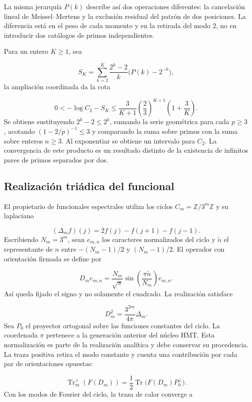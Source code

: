 La misma jerarquía $P(k)$ describe así dos operaciones diferentes: la cancelación lineal de Meissel–Mertens y la exclusión residual del patrón de dos posiciones. La diferencia está en el peso de cada momento y en la retirada del modo $2$, no en introducir dos catálogos de primos independientes.

Para un entero \(K\ge1\), sea

\[
S_K=\sum_{k=2}^K\frac{2^k-2}{k}\bigl(P(k)-2^{-k}\bigr),
\]
la ampliación coordinada da la cota

\[
0<-\log C_2-S_K
\le\frac3{K+1}\left(\frac23\right)^{K+1}\left(1+\frac3K\right).
\]
Se obtiene sustituyendo $2^k-2\le2^k$, sumando la serie geométrica para cada $p\ge3$, acotando $(1-2/p)^{-1}\le3$ y comparando la suma sobre primos con la suma sobre enteros $n\ge3$. Al exponentiar se obtiene un intervalo para $C_2$. La convergencia de este producto es un resultado distinto de la existencia de infinitos pares de primos separados por dos.



\subsection{Realización triádica del funcional}
El propietario de funcionales espectrales utiliza los ciclos $C_m=\mathbb Z/3^m\mathbb Z$ y su laplaciano

\[
(\Delta_mf)(j)=2f(j)-f(j+1)-f(j-1).
\]
Escribiendo \(N_m=3^m\), sean \(e_{m,n}\) los caracteres normalizados del ciclo y \(\widetilde n\) el representante de \(n\) entre \(-(N_m-1)/2\) y \((N_m-1)/2\). El operador con orientación firmada se define por

\[
D_m e_{m,n}=\frac{N_m}{\sqrt{\pi}}
\sin\left(\frac{\pi\widetilde n}{N_m}\right)e_{m,n}.
\]
Así queda fijado el signo y no solamente el cuadrado. La realización satisface

\[
D_m^2=\frac{3^{2m}}{4\pi}\Delta_m.
\]
Sea \(P_0\) el proyector ortogonal sobre las funciones constantes del ciclo. La coordenada $\pi$ pertenece a la generación anterior del núcleo HMT. Esta normalización es parte de la realización analítica y debe conservar su procedencia. La traza positiva retira el modo constante y cuenta una contribución por cada par de orientaciones opuestas:

\[
\operatorname{Tr}_m^+(F(D_m))
=\frac12\operatorname{Tr}\bigl(F(D_m)P_0^\perp\bigr).
\]
Con los modos de Fourier del ciclo, la traza de calor converge a

